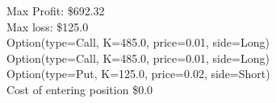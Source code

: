 Max Profit: \$692.32
\\Max loss: \$125.0
\\Option(type=Call, K=485.0, price=0.01, side=Long)
\\Option(type=Call, K=485.0, price=0.01, side=Long)
\\Option(type=Put, K=125.0, price=0.02, side=Short)
\\Cost of entering position \$0.0